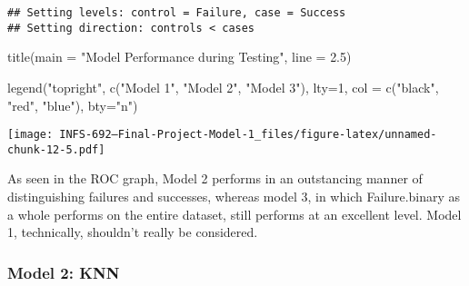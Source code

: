 \documentclass[
]{article}
\newenvironment{Shaded}{\begin{snugshade}}{\end{snugshade}}
\newcommand{\AttributeTok}[1]{\textcolor[rgb]{0.77,0.63,0.00}{#1}}
\newcommand{\ConstantTok}[1]{\textcolor[rgb]{0.00,0.00,0.00}{#1}}
\newcommand{\DecValTok}[1]{\textcolor[rgb]{0.00,0.00,0.81}{#1}}
\newcommand{\FloatTok}[1]{\textcolor[rgb]{0.00,0.00,0.81}{#1}}
\newcommand{\FunctionTok}[1]{\textcolor[rgb]{0.00,0.00,0.00}{#1}}
\newcommand{\NormalTok}[1]{#1}
\newcommand{\SpecialCharTok}[1]{\textcolor[rgb]{0.00,0.00,0.00}{#1}}
\newcommand{\StringTok}[1]{\textcolor[rgb]{0.31,0.60,0.02}{#1}}
\begin{document}
\begin{Shaded}
\end{Shaded}

\begin{verbatim}
## Setting levels: control = Failure, case = Success
## Setting direction: controls < cases
\end{verbatim}

\begin{Shaded}
\begin{Highlighting}[]
\FunctionTok{title}\NormalTok{(}\AttributeTok{main =} \StringTok{"Model Performance during Testing"}\NormalTok{, }\AttributeTok{line =} \FloatTok{2.5}\NormalTok{)}


\FunctionTok{legend}\NormalTok{(}\StringTok{"topright"}\NormalTok{, }\FunctionTok{c}\NormalTok{(}\StringTok{"Model 1"}\NormalTok{, }\StringTok{"Model 2"}\NormalTok{, }\StringTok{"Model 3"}\NormalTok{), }\AttributeTok{lty=}\DecValTok{1}\NormalTok{, }
    \AttributeTok{col =} \FunctionTok{c}\NormalTok{(}\StringTok{"black"}\NormalTok{, }\StringTok{"red"}\NormalTok{, }\StringTok{"blue"}\NormalTok{), }\AttributeTok{bty=}\StringTok{"n"}\NormalTok{)}
\end{Highlighting}
\end{Shaded}

\texttt{[image: INFS-692---Final-Project-Model-1\_files/figure-latex/unnamed-chunk-12-5.pdf]}

As seen in the ROC graph, Model 2 performs in an outstancing manner of
distinguishing failures and successes, whereas model 3, in which
Failure.binary as a whole performs on the entire dataset, still performs
at an excellent level. Model 1, technically, shouldn't really be
considered.

\hypertarget{model-2-knn}{%
\subsubsection{Model 2: KNN}\label{model-2-knn}}
\end{document}
